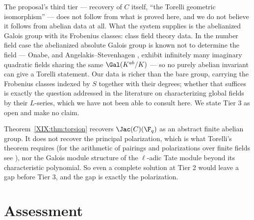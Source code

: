 \begin{remark}\label{XIX:rem:tier3}
The proposal's third tier --- recovery of $C$ itself, ``the Torelli geometric isomorphism'' ---
does not follow from what is proved here, and we do not believe it follows from abelian data
at all. What the system supplies is the abelianized Galois group with its Frobenius classes:
class field theory data. In the number field case the abelianized absolute Galois group is
known not to determine the field --- Onabe, and Angelakis--Stevenhagen \cite{AS}, exhibit infinitely
many imaginary quadratic fields sharing the same $\Gal(K^{ab}/K)$ --- so no purely abelian
invariant can give a Torelli statement. Our data is richer than the bare group, carrying the
Frobenius classes indexed by $S$ together with their degrees; whether that suffices is
exactly the question addressed in the literature on characterizing global fields by their
$L$-series, which we have not been able to consult here. We state Tier 3 as open and make no
claim.
\end{remark}

\begin{remark}\label{XIX:rem:tier2limits}
Theorem~\ref{XIX:thm:torsion} recovers $\Jac(C)(\F_q)$ as an abstract finite abelian group. It
does not recover the principal polarization, which is what Torelli's theorem requires (for
the arithmetic of pairings and polarizations over finite fields see \cite{HoweWeil}), nor
the Galois module structure of the $\ell$-adic Tate module beyond its characteristic
polynomial. So even a complete solution at Tier 2 would leave a gap before Tier 3, and the
gap is exactly the polarization.
\end{remark}

\section{Assessment}

